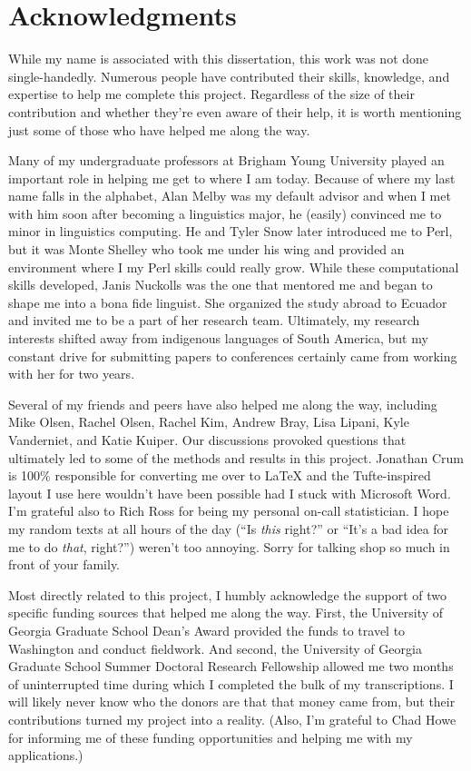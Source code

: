 \setcounter{page}{4}

\chapter*{Acknowledgments}

While my name is associated with this dissertation, this work was not done single-handedly. Numerous people have contributed their skills, knowledge, and expertise to help me complete this project. Regardless of the size of their contribution and whether they're even aware of their help, it is worth mentioning just some of those who have helped me along the way.

Many of my undergraduate professors at Brigham Young University played an important role in helping me get to where I am today. Because of where my last name falls in the alphabet, Alan Melby was my default advisor and when I met with him soon after becoming a linguistics major, he (easily) convinced me to minor in linguistics computing. He and Tyler Snow later introduced me to Perl, but it was Monte Shelley who took me under his wing and provided an environment where I my Perl skills could really grow. While these computational skills developed, Janis Nuckolls was the one that mentored me and began to shape me into a bona fide linguist. She organized the study abroad to Ecuador and invited me to be a part of her research team. Ultimately, my research interests shifted away from indigenous languages of South America, but my constant drive for submitting papers to conferences certainly came from working with her for two years.

Several of my friends and peers have also helped me along the way, including Mike Olsen, Rachel Olsen, Rachel Kim, Andrew Bray, Lisa Lipani, Kyle Vanderniet, and Katie Kuiper. Our discussions provoked questions that ultimately led to some of the methods and results in this project. Jonathan Crum is 100\% responsible for converting me over to \LaTeX{} and the Tufte-inspired layout I use here wouldn't have been possible had I stuck with Microsoft Word. I'm grateful also to Rich Ross for being my personal on-call statistician. I hope my random texts at all hours of the day (``Is \textit{this} right?'' or ``It's a bad idea for me to do \textit{that}, right?'') weren't too annoying. Sorry for talking shop so much in front of your family.

Most directly related to this project, I humbly acknowledge the support of two specific funding sources that helped me along the way. First, the University of Georgia Graduate School Dean's Award provided the funds to travel to Washington and conduct fieldwork. And second, the University of Georgia Graduate School Summer Doctoral Research Fellowship allowed me two months of uninterrupted time during which I completed the bulk of my transcriptions. I will likely never know who the donors are that that money came from, but their contributions turned my project into a reality. (Also, I'm grateful to Chad Howe for informing me of these funding opportunities and helping me with my applications.)


